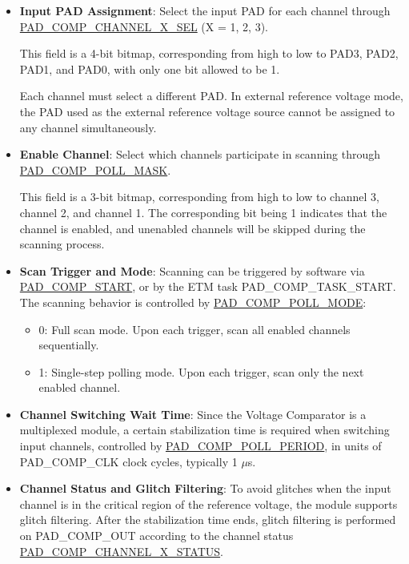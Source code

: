 \documentclass[main\_\_EN.tex]{subfiles}
\begin{document}
\begin{itemize}
    \item \textbf{Input PAD Assignment}: Select the input PAD for each channel through \hyperref[fielddesc:PADCOMPCHANNEL1SEL]{PAD\_COMP\_CHANNEL\_X\_SEL} (X = 1, 2, 3).
    
    This field is a 4-bit bitmap, corresponding from high to low to PAD3, PAD2, PAD1, and PAD0, with only one bit allowed to be 1.
    
    \begin{tiplisting}
    Each channel must select a different PAD. In external reference voltage mode, the PAD used as the external reference voltage source cannot be assigned to any channel simultaneously.
    \end{tiplisting}

    \item \textbf{Enable Channel}: Select which channels participate in scanning through \hyperref[fielddesc:PADCOMPPOLLMASK]{PAD\_COMP\_POLL\_MASK}.
    
    This field is a 3-bit bitmap, corresponding from high to low to channel 3, channel 2, and channel 1. The corresponding bit being 1 indicates that the channel is enabled, and unenabled channels will be skipped during the scanning process.

    \item \textbf{Scan Trigger and Mode}: Scanning can be triggered by software via \hyperref[fielddesc:PADCOMPSTART]{PAD\_COMP\_START}, or by the ETM task PAD\_COMP\_TASK\_START. The scanning behavior is controlled by \hyperref[fielddesc:PADCOMPPOLLMODE]{PAD\_COMP\_POLL\_MODE}:
      \begin{itemize}
        \item 0: Full scan mode. Upon each trigger, scan all enabled channels sequentially.
        \item 1: Single-step polling mode. Upon each trigger, scan only the next enabled channel.
      \end{itemize}
            

    \item \textbf{Channel Switching Wait Time}: Since the Voltage Comparator is a multiplexed module, a certain stabilization time is required when switching input channels, controlled by \hyperref[fielddesc:PADCOMPPOLLPERIOD]{PAD\_COMP\_POLL\_PERIOD}, in units of PAD\_COMP\_CLK clock cycles, typically 1 $\mu$s.
            
    \item \textbf{Channel Status and Glitch Filtering}: To avoid glitches when the input channel is in the critical region of the reference voltage, the module supports glitch filtering. After the stabilization time ends, glitch filtering is performed on PAD\_COMP\_OUT according to the channel status \hyperref[fielddesc:PADCOMPCHANNEL1STATUS]{PAD\_COMP\_CHANNEL\_X\_STATUS}.


\end{itemize}
\end{document}
